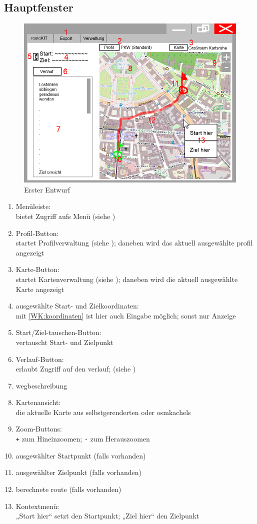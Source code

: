 \documentclass[a4paper, 11pt]{article}
\begin{document}
\subsection{Hauptfenster}
\begin{figure}[H]
\centering
\includegraphics[width=0.9\linewidth]{mockup_screenshot_main}
\caption{Erster Entwurf}
\label{fig:mockupscreenshotmain}
\end{figure}
\begin{enumerate}
\item Menüleiste:\\
bietet Zugriff aufs Menü (siehe )
\item Profil-Button:\\
startet Profilverwaltung (siehe ); daneben wird das aktuell ausgewählte \gls{profil} angezeigt
\item Karte-Button:\\
startet Kartenverwaltung (siehe ); daneben wird die aktuell ausgewählte Karte angezeigt
\item ausgewählte Start- und Zielkoordinaten:\\
mit \ref{WK:koordinaten} ist hier auch Eingabe möglich; sonst nur Anzeige
\item Start/Ziel-tauschen-Button:\\
vertauscht Start- und Zielpunkt
\item Verlauf-Button:\\
erlaubt Zugriff auf den \gls{verlauf}; (siehe )
\item \gls{wegbeschreibung}
\item Kartenansicht:\\
die aktuelle Karte aus selbstgerenderten oder \glspl{osmkachel}
\item Zoom-Buttons:\\
\texttt{+} zum Hineinzoomen; \texttt{-} zum Herauszoomen
\item ausgewählter Startpunkt (falls vorhanden)
\item ausgewählter Zielpunkt (falls vorhanden)
\item berechnete \gls{route} (falls vorhanden)
\item Kontextmenü:\\
„Start hier“ setzt den Startpunkt; „Ziel hier“ den Zielpunkt
\end{enumerate}
\end{document}
